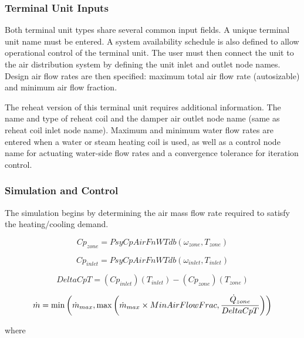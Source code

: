 \subsubsection{Terminal Unit Inputs}\label{terminal-unit-inputs}

Both terminal unit types share several common input fields. A unique terminal unit name must be entered. A system availability schedule is also defined to allow operational control of the terminal unit. The user must then connect the unit to the air distribution system by defining the unit inlet and outlet node names. Design air flow rates are then specified: maximum total air flow rate (autosizable) and minimum air flow fraction.

The reheat version of this terminal unit requires additional information. The name and type of reheat coil and the damper air outlet node name (same as reheat coil inlet node name). Maximum and minimum water flow rates are entered when a water or steam heating coil is used, as well as a control node name for actuating water-side flow rates and a convergence tolerance for iteration control.

\subsubsection{Simulation and Control}\label{simulation-and-control}

The simulation begins by determining the air mass flow rate required to satisfy the heating/cooling demand.

\begin{equation}
C{p_{zone}} = PsyCpAirFnWTdb\left( {{\omega_{zone}},{T_{zone}}} \right)
\end{equation}

\begin{equation}
C{p_{inlet}} = PsyCpAirFnWTdb\left( {{\omega_{inlet}},{T_{inlet}}} \right)
\end{equation}

\begin{equation}
DeltaCpT = \left( {C{p_{inlet}}} \right)\left( {{T_{inlet}}} \right) - \left( {C{p_{zone}}} \right)\left( {{T_{zone}}} \right)
\end{equation}

\begin{equation}
  \dot{m} = \min \PB{ \dot{m}_{max}, \max \PB{ \dot{m}_{max}\times MinAirFlowFrac,\frac{\dot{Q}_{zone}}{DeltaCpT} } }
\end{equation}

where


